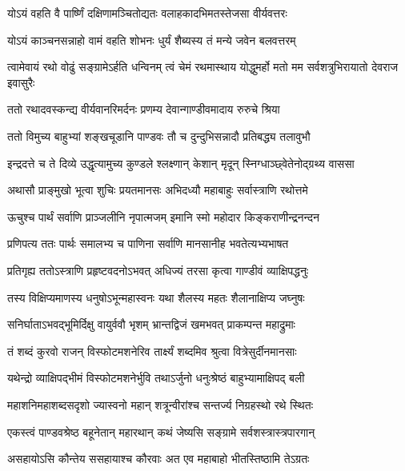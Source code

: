\twolineshloka
{योऽयं वहति वै पार्ष्णिं दक्षिणामञ्चितोद्यतः}
{वलाहकादभिमतस्तेजसा वीर्यवत्तरः}


\twolineshloka
{योऽयं काञ्चनसन्नाहो वामं वहति शोभनः}
{धुर्यं शैब्यस्य तं मन्ये जवेन बलवत्तरम्}


\threelineshloka
{त्वामेवायं रथो वोढुं सङ्ग्रामेऽर्हति धन्विनम्}
{त्वं चेमं रथमास्थाय योद्धुमर्हो मतो मम}
{सर्वशत्रुभिरायातो देवराज इवासुरैः}



\twolineshloka
{ततो रथादवस्कन्द्य वीर्यवानरिमर्दनः}
{प्रणम्य देवान्गाण्डीवमादाय रुरुचे श्रिया}


\twolineshloka
{ततो विमुच्य बाहुभ्यां शङ्खचूडानि पाण्डवः}
{तौ च दुन्दुभिसन्नादौ प्रतिबद्ध्य तलावुभौ}


\twolineshloka
{इन्द्रदत्ते च ते दिव्ये उद्धृत्यामुच्य कुण्डले}
{श्लक्ष्णान् केशान् मृदून् स्निग्धाञ्छ्वेतेनोद्ग्रथ्य वाससा}


\twolineshloka
{अथासौ प्राङ्मुखो भूत्वा शुचिः प्रयतमानसः}
{अभिदध्यौ महाबाहुः सर्वास्त्राणि रथोत्तमे}


\twolineshloka
{ऊचुश्च पार्थं सर्वाणि प्राञ्जलीनि नृपात्मजम्}
{इमानि स्मो महोदार किङ्कराणीन्द्रनन्दन}


\twolineshloka
{प्रणिपत्य ततः पार्थः समालभ्य च पाणिना}
{सर्वाणि मानसानीह भवतेत्यभ्यभाषत}


\twolineshloka
{प्रतिगृह्य ततोऽस्त्राणि प्रहृष्टवदनोऽभवत्}
{अधिज्यं तरसा कृत्वा गाण्डीवं व्याक्षिपद्धनुः}


\twolineshloka
{तस्य विक्षिप्यमाणस्य धनुषोऽभून्महास्वनः}
{यथा शैलस्य महतः शैलानाक्षिप्य जघ्नुषः}


\twolineshloka
{सनिर्घाताऽभवद्भूमिर्दिक्षु वायुर्ववौ भृशम्}
{भ्रान्तद्विजं खमभवत् प्राकम्पन्त महाद्रुमाः}


\twolineshloka
{तं शब्दं कुरवो राजन् विस्फोटमशनेरिव}
{तार्क्ष्यं शब्दमिव श्रुत्वा वित्रेसुर्दीनमानसाः}


\twolineshloka
{यथेन्द्रो व्याक्षिपद्भीमं विस्फोटमशनेर्भुवि}
{तथाऽर्जुनो धनुःश्रेष्ठं बाहुभ्यामाक्षिपद् बली}


\twolineshloka
{महाशनिमहाशब्दसदृशो ज्यास्वनो महान्}
{शत्रून्वीरांश्च सन्तर्ज्य निग्रहस्थो रथे स्थितः}




\twolineshloka
{एकस्त्वं पाण्डवश्रेष्ठ बहूनेतान् महारथान्}
{कथं जेष्यसि सङ्ग्रामे सर्वशस्त्रास्त्रपारगान्}


\twolineshloka
{असहायोऽसि कौन्तेय ससहायाश्च कौरवाः}
{अत एव महाबाहो भीतस्तिष्ठामि तेऽग्रतः}


